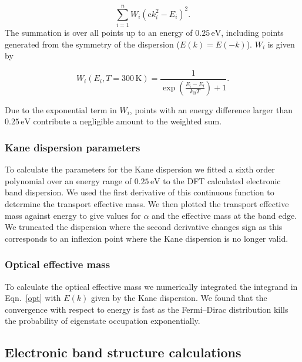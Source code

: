 \begin{equation}
\sum^n_{i=1}W_i(\mathrm{c}k_i^2 - E_i)^2.
\end{equation}
The summation is over all points up to an energy of $0.25\,\mathrm{eV}$, including points generated from the symmetry of the dispersion ($E(k)=E(-k)$). 
$W_i$ is given by

\begin{equation}
W_{i}(E_i,T=300\,\mathrm{K}) = \frac{1}{\exp\left(\frac{E_i-E_{\text{f}}}{k_{\text{B}}T}\right)+1}.
\end{equation}

Due to the exponential term in $W_i$, points with an energy difference larger than $0.25\,\mathrm{eV}$ contribute a negligible amount to the weighted sum. 

\subsubsection{Kane dispersion parameters}

To calculate the parameters for the Kane dispersion we fitted a sixth order polynomial over an energy range of $0.25\,\mathrm{eV}$ to the DFT calculated electronic band dispersion. We used the first derivative of this continuous function to determine the transport effective mass. We then plotted the transport effective mass against energy to give values for $\alpha$ and the effective mass at the band edge. We truncated the dispersion where the second derivative changes sign as this corresponds to an inflexion point where the Kane dispersion is no longer valid. 

\subsubsection{Optical effective mass}

To calculate the optical effective mass we numerically integrated the integrand in Eqn.\ \ref{opt} with $E(k)$ given by the Kane dispersion. We found that the convergence with respect to energy is fast as the Fermi--Dirac distribution kills the probability of eigenstate occupation exponentially. 

\subsection{Electronic band structure calculations}

